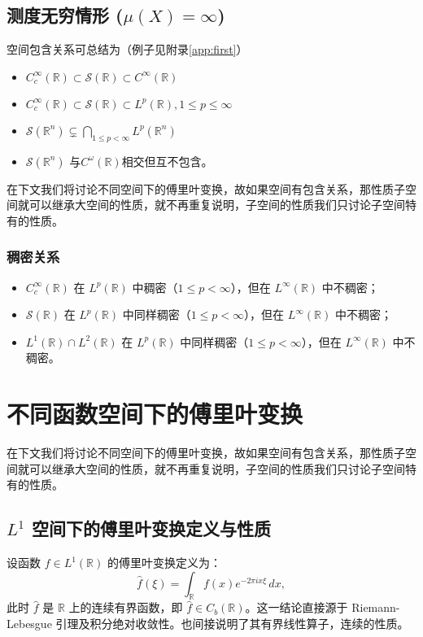 \documentclass[12pt,a4paper]{article}
\newcommand{\diff}{\mathop{}\!\mathrm{d}}  %
\def\diff{d}%
\theoremstyle{plain}
\theoremstyle{definition}
\theoremstyle{remark}
\begin{document}
	\subsection{测度无穷情形 ($\mu(X)=\infty$)}
	空间包含关系可总结为（例子见附录\ref{app:first}）
\begin{itemize}
\item	$	C_c^\infty(\mathbb{R}) \subset \mathcal{S}(\mathbb{R}) \subset C^\infty(\mathbb{R})$
\item	$C_c^\infty(\mathbb{R}) \subset \mathcal{S}(\mathbb{R}) \subset  L^p(\mathbb{R}) ,1\leq p\le\infty$
\item	$\mathcal{S}(\mathbb{R}^n) \subsetneq \bigcap_{1 \leq p < \infty} L^p(\mathbb{R}^n)$
\item	 $\mathcal{S}(\mathbb{R}^n)$ 与$ C^\omega(\mathbb{R})$相交但互不包含。
\end{itemize}
 
 
 
在下文我们将讨论不同空间下的傅里叶变换，故如果空间有包含关系，那性质子空间就可以继承大空间的性质，就不再重复说明，子空间的性质我们只讨论子空间特有的性质。

\subsubsection{稠密关系}
\begin{itemize}
\item $C_c^\infty(\mathbb{R})$ 在 $L^p(\mathbb{R})$ 中稠密（$1 \leq p < \infty$），但在 $L^\infty(\mathbb{R})$ 中不稠密；
 
	\item $\mathcal{S}(\mathbb{R})$ 在 $L^p(\mathbb{R})$ 中同样稠密（$1 \leq p < \infty$），但在 $L^\infty(\mathbb{R})$ 中不稠密；
	 
	 \item $ L^1(\mathbb{R}) \cap L^2(\mathbb{R})$ 在 $L^p(\mathbb{R})$ 中同样稠密（$1 \leq p < \infty$），但在 $L^\infty(\mathbb{R})$ 中不稠密。
	\end{itemize}



	
\section{不同函数空间下的傅里叶变换}
	在下文我们将讨论不同空间下的傅里叶变换，故如果空间有包含关系，那性质子空间就可以继承大空间的性质，就不再重复说明，子空间的性质我们只讨论子空间特有的性质。
\subsection{$L^1$ 空间下的傅里叶变换定义与性质}
设函数 $f \in L^1(\mathbb{R})$ 的傅里叶变换定义为：
\[
\hat{f}(\xi) = \int_{\mathbb{R}} f(x) e^{-2\pi i x\xi} \, \diff x,
\]
此时 $\hat{f}$ 是 $\mathbb{R}$ 上的连续有界函数，即 $\hat{f} \in C_b(\mathbb{R})$。这一结论直接源于 Riemann-Lebesgue 引理及积分绝对收敛性。也间接说明了其有界线性算子，连续的性质。
\end{document}
